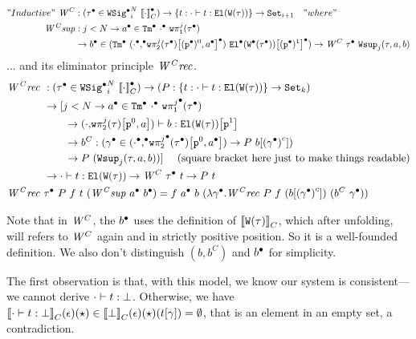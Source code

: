 \begin{align*}
  "Inductive"~\mathit{W}^C &: ({\tau}^\bullet \in {\ensuremath{{\texttt{WSig}}^\bullet}}_{i}^{N}~{{\llbracket {\cdot} \rrbracket}_C^\bullet}) \to \{ t :  {\cdot} \vdash {t} : {\texttt{El}({\texttt{W}({\tau})})}  \} \to \texttt{Set}_{i + 1} \quad "where" \\
    \mathit{W^Csup} &: j < N \to {a}^\bullet \in {\texttt{Tm}}^\bullet~{{\cdot}^\bullet}~{\texttt{w}\pi^{j}_{\texttt{1}}({{\tau}^\bullet})} \\
    & \to {b}^\bullet \in ({\texttt{Tm}}^\bullet~{({\cdot}^\bullet {,}^\bullet {\ensuremath{\texttt{w}\pi^{j}_{\texttt{2}}({{\tau}^\bullet})}}\!\left[{{(\texttt{p}^\bullet)^{0}},{{a}^\bullet}}\right]^\bullet) }~{{{\texttt{El}}^\bullet({{\texttt{W}}^\bullet({{\tau}^\bullet})})}\!\left[{(\texttt{p}^\bullet)^{1}}\right]^\bullet}) \to \mathit{W}^C~{\tau}^\bullet~\texttt{Wsup}_{j}({\tau},{a},{b})
\end{align*}
... and its eliminator principle $\mathit{W^Crec}$. 
\begin{align*}
  \mathit{W^Crec} \  &: ({\tau}^\bullet \in {\ensuremath{{\texttt{WSig}}^\bullet}}_{i}^{N}~{{\llbracket {\cdot} \rrbracket}_C^\bullet}) \to 
    (P : \{ t :  {\cdot} \vdash {t} : {\texttt{El}({\texttt{W}({\tau})})}  \} \to \texttt{Set}_{k})  \\
    & \to [j < N \to  {a}^\bullet \in {\texttt{Tm}}^\bullet~{{\cdot}^\bullet}~{{{\texttt{w}\pi^{j}_{\texttt{1}}}}^\bullet({{\tau}^\bullet})} \\ 
    & \quad \quad \to 
     {({\cdot} {,} \ensuremath{{\texttt{w}\pi^{j}_{\texttt{2}}({{\tau}})}\!\left[{{\texttt{p}^{0}},{{a}}}\right]}) } \vdash {b} : {{\texttt{El}({\texttt{W}({\tau})})}\!\left[{\texttt{p}^{1}}\right]}  \\ 
    & \quad \quad \to b^C : ({\gamma}^\bullet \in ({\cdot}^\bullet {,}^\bullet {\ensuremath{{{\texttt{w}\pi^{j}_{\texttt{2}}}}^\bullet({{\tau}^\bullet})}}\!\left[{{\texttt{p}^{0}},{{a}^\bullet}}\right]) \to P~{b}\!\left[{{({{\gamma}^\bullet})}^c}\right]) \\
    & \quad \quad \to P~(\texttt{Wsup}_{j}({\tau},{a},{b})) ] \quad \text{ (square bracket here just to make things readable)} \\
    & \to  {\cdot} \vdash {t} : {\texttt{El}({\texttt{W}({\tau})})}  \to \mathit{W}^C~{\tau}^\bullet~t \to P~t \\
  \mathit{W^Crec} \  & {\tau}^\bullet~P~f~t~(\mathit{W^Csup}~{a}^\bullet~{b}^\bullet) = f~{a}^\bullet~b~(\lambda {\ensuremath{\gamma}}^\bullet. \mathit{W^Crec}~P~f~({b}\!\left[{{({{\gamma}^\bullet})}^c}\right])~(b^C~{\gamma}^\bullet))
\end{align*}

Note that in $\mathit{W}^C$, the ${b}^\bullet$ uses the definition of ${\llbracket {\ensuremath{\texttt{W}({\tau})}} \rrbracket}_C$, which after unfolding, will refers to $\mathit{W}^C$ again and in strictly positive position. So it is a well-founded definition. We also don't distinguish $(b, b^C)$ and ${b}^\bullet$ for simplicity.


The first observation is that, with this model, we know our system is consistent---we cannot derive $ {\cdot} \vdash {t} : {\bot} $. Otherwise, we have ${\llbracket {\ensuremath{ {\cdot} \vdash {t} : {\bot} }} \rrbracket}_C(\epsilon)(\star) \in {\llbracket {\bot} \rrbracket}_C(\epsilon)(\star)({t}\!\left[{\gamma}\right]) = \emptyset$, that is an element in an empty set, a contradiction.

